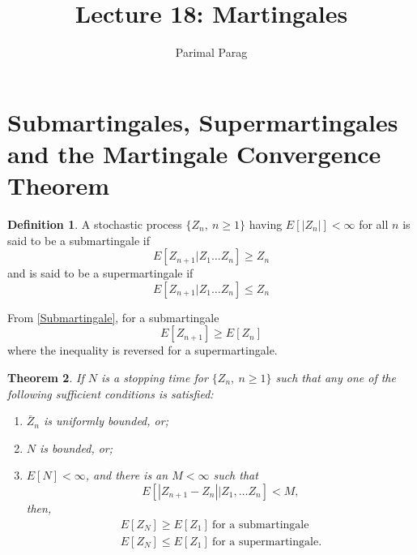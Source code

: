 \documentclass[a4paper,10pt]{article}
\date{}
\title{Lecture 18: Martingales}
\author{Parimal Parag}
\theoremstyle{plain}
\newtheorem{thm}{Theorem}[section]
\theoremstyle{definition}
\newtheorem{defn}[thm]{Definition}
\theoremstyle{remark}
\begin{document}
\maketitle
\section{ Submartingales, Supermartingales and the Martingale Convergence Theorem}
\begin{defn}
A stochastic process $\{Z_n,~  n \geq 1\}$ having $E[|Z_n|]< \infty$ for all $n$ is said to be a submartingale if
\begin{equation}
\label{Submartingale}
E[Z_{n+1}|Z_1 \hdots Z_n] \geq Z_n
\end{equation}
and is said to be a supermartingale if
\begin{equation}
\label{Supermartingale}
E[Z_{n+1}|Z_1 \hdots Z_n] \leq Z_n
\end{equation}
\end{defn}
From \ref{Submartingale}, for a submartingale
\begin{equation*}
E[Z_{n+1}] \geq E[Z_n]
\end{equation*}
where the inequality is reversed for a supermartingale. 
\begin{thm}
\label{Stoppingtime_theorem}
If $N$ is a stopping time for $\{Z_n,~ n\geq 1\}$ such that any one of the following sufficient conditions is satisfied:
\begin{enumerate}
\item $\bar{Z}_n$ is uniformly bounded, or;
\item $N$ is bounded, or;
\item $E[N]< \infty$, and there is an $M < \infty$ such that
\begin{equation*}
E[|Z_{n+1}-Z_n| |Z_1, \hdots Z_n]<M,
\end{equation*}
then,
\begin{eqnarray*}
E[Z_N] \geq E[Z_1] ~ \text {for a submartingale}\\
E[Z_N] \leq E[Z_1] ~ \text {for a supermartingale}.
\end{eqnarray*}
\end{enumerate}
\end{thm}
\end{document}

